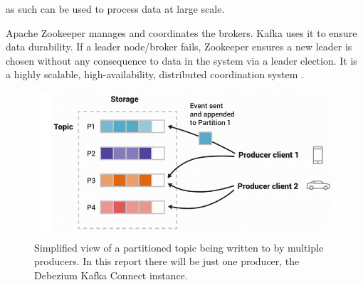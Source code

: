 \begin{flushleft}
\begin{itemize}
		      as such can be used to process data at large scale.
	\end{itemize}
	Apache Zookeeper manages and coordinates the brokers. Kafka uses it to ensure data durability. If a leader node/broker fails, Zookeeper ensures a new leader is
	chosen without any consequence to data in the system via a leader election. It is a highly scalable, high-availability, distributed coordination system \autocite{WhatZookeeperWhy}.
	\begin{figure}[ht]
		\begin{center}
			\includegraphics[width=.7\textwidth]{figures/topics.png}
			\caption{Simplified view of a partitioned topic being written to by multiple producers\autocite{ApacheKafka}. In this report there will be just one producer, the Debezium Kafka Connect instance.}
			\label{fig: 1.2}
		\end{center}
	\end{figure}
	\pagebreak

\end{flushleft}
